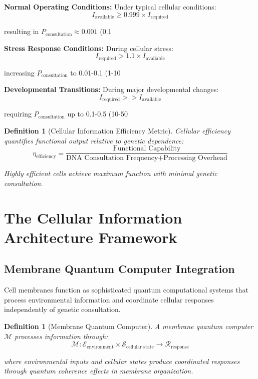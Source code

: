 \documentclass[12pt,a4paper]{article}
\newtheorem{definition}[theorem]{Definition}
\begin{document}
\textbf{Normal Operating Conditions:}
Under typical cellular conditions:
$$I_{\text{available}} \geq 0.999 \times I_{\text{required}}$$

resulting in $P_{\text{consultation}} \approx 0.001$ (0.1%

\textbf{Stress Response Conditions:}
During cellular stress:
$$I_{\text{required}} > 1.1 \times I_{\text{available}}$$

increasing $P_{\text{consultation}}$ to 0.01-0.1 (1-10%

\textbf{Developmental Transitions:}
During major developmental changes:
$$I_{\text{required}} >> I_{\text{available}}$$

requiring $P_{\text{consultation}}$ up to 0.1-0.5 (10-50%

\begin{definition}[Cellular Information Efficiency Metric]
Cellular efficiency quantifies functional output relative to genetic dependence:
$$\eta_{\text{efficiency}} = \frac{\text{Functional Capability}}{\text{DNA Consultation Frequency} + \text{Processing Overhead}}$$

Highly efficient cells achieve maximum function with minimal genetic consultation.
\end{definition}

\section{The Cellular Information Architecture Framework}

\subsection{Membrane Quantum Computer Integration}

Cell membranes function as sophisticated quantum computational systems that process environmental information and coordinate cellular responses independently of genetic consultation.

\begin{definition}[Membrane Quantum Computer]
A membrane quantum computer $\mathcal{M}$ processes information through:
$$\mathcal{M}: \mathcal{E}_{\text{environment}} \times \mathcal{S}_{\text{cellular state}} \rightarrow \mathcal{R}_{\text{response}}$$

where environmental inputs and cellular states produce coordinated responses through quantum coherence effects in membrane organization.
\end{definition}
\end{document}

